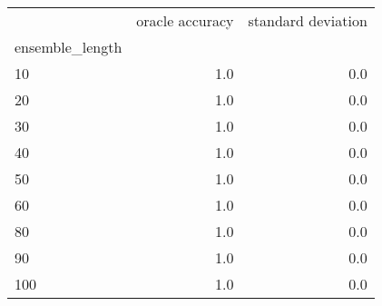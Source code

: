 \begin{tabular}{lrr}
\toprule
{} &  oracle accuracy &  standard deviation \\
ensemble\_length &                  &                     \\
\midrule
10              &              1.0 &                 0.0 \\
20              &              1.0 &                 0.0 \\
30              &              1.0 &                 0.0 \\
40              &              1.0 &                 0.0 \\
50              &              1.0 &                 0.0 \\
60              &              1.0 &                 0.0 \\
80              &              1.0 &                 0.0 \\
90              &              1.0 &                 0.0 \\
100             &              1.0 &                 0.0 \\
\bottomrule
\end{tabular}
